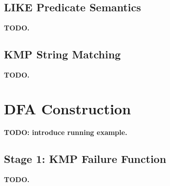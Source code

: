 \documentclass[sigconf,nonacm]{acmart}
\begin{document}
\subsection{LIKE Predicate Semantics}
\label{sec:bg-like}

\textbf{TODO.}


\subsection{KMP String Matching}
\label{sec:bg-kmp}

\textbf{TODO.}


\section{DFA Construction}
\label{sec:construction}



\textbf{TODO: introduce running example.}


\subsection{Stage 1: KMP Failure Function}
\label{sec:stage1}


\textbf{TODO.}

\end{document}
